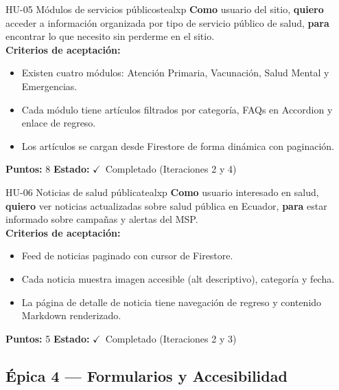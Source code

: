 \documentclass[12pt, a4paper]{article}
\newcommand{\cmark}{\textcolor{successgreen}{$\checkmark$}}
\begin{document}
\begin{storybox}{HU-05 \quad Módulos de servicios públicos}{tealxp}
\textbf{Como} usuario del sitio,
\textbf{quiero} acceder a información organizada por tipo de servicio público de salud,
\textbf{para} encontrar lo que necesito sin perderme en el sitio.\\[4pt]
\textbf{Criterios de aceptación:}
\begin{itemize}
  \item Existen cuatro módulos: Atención Primaria, Vacunación, Salud Mental y Emergencias.
  \item Cada módulo tiene artículos filtrados por categoría, FAQs en Accordion y enlace de regreso.
  \item Los artículos se cargan desde Firestore de forma dinámica con paginación.
\end{itemize}
\textbf{Puntos:} 8 \quad \textbf{Estado:} \cmark~Completado (Iteraciones 2 y 4)
\end{storybox}

\begin{storybox}{HU-06 \quad Noticias de salud pública}{tealxp}
\textbf{Como} usuario interesado en salud,
\textbf{quiero} ver noticias actualizadas sobre salud pública en Ecuador,
\textbf{para} estar informado sobre campañas y alertas del MSP.\\[4pt]
\textbf{Criterios de aceptación:}
\begin{itemize}
  \item Feed de noticias paginado con cursor de Firestore.
  \item Cada noticia muestra imagen accesible (alt descriptivo), categoría y fecha.
  \item La página de detalle de noticia tiene navegación de regreso y contenido Markdown renderizado.
\end{itemize}
\textbf{Puntos:} 5 \quad \textbf{Estado:} \cmark~Completado (Iteraciones 2 y 3)
\end{storybox}

\subsection{Épica 4 --- Formularios y Accesibilidad}
\end{document}
